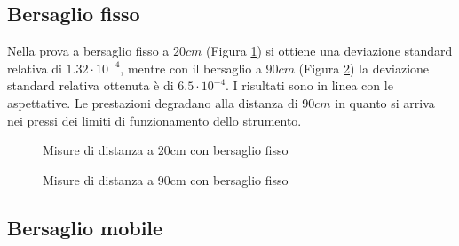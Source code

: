 \subsection{Bersaglio fisso}
Nella prova a bersaglio fisso a $20cm$ (Figura \ref{misfisso520}) si ottiene una deviazione standard relativa di $1.32 \cdot 10^{-4}$, mentre con il bersaglio a $90cm$  (Figura \ref{misfisso590}) la deviazione standard relativa ottenuta è di $6.5 \cdot 10^{-4}$.
I risultati sono in linea con le aspettative. Le prestazioni degradano alla distanza di $90cm$ in quanto si arriva nei pressi dei limiti di funzionamento dello strumento.

\begin{figure}[H]
	\centering
\end{figure}
\begin{figure}[H]
	\centering
	\caption{Misure di distanza a 20cm con bersaglio fisso }\label{misfisso520}
\end{figure}
\begin{figure}[H]
	\centering
\end{figure}
\begin{figure}[H]
	\centering
	\caption{Misure di distanza a 90cm con bersaglio fisso }\label{misfisso590}
\end{figure}

\subsection{Bersaglio mobile}

